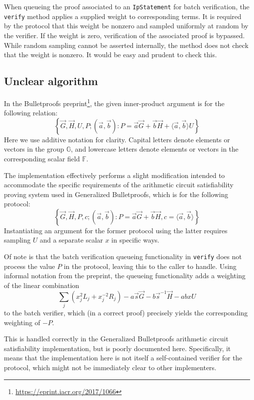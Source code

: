 \documentclass{article}
\begin{document}
When queueing the proof associated to an \texttt{IpStatement} for batch verification, the \texttt{verify} method applies a supplied weight to corresponding terms.
It is required by the protocol that this weight be nonzero and sampled uniformly at random by the verifier.
If the weight is zero, verification of the associated proof is bypassed.
While random sampling cannot be asserted internally, the method does not check that the weight is nonzero.
It would be easy and prudent to check this.


\subsection{Unclear algorithm}

In the Bulletproofs preprint\footnote{\url{https://eprint.iacr.org/2017/1066}}, the given inner-product argument is for the following relation:
$$\left\{ \vec{G}, \vec{H}, U, P ; (\vec{a}, \vec{b}) : P = \vec{a} \vec{G} + \vec{b} \vec{H} + \langle \vec{a}, \vec{b} \rangle U \right\}$$
Here we use additive notation for clarity.
Capital letters denote elements or vectors in the group $\mathbb{G}$, and lowercase letters denote elements or vectors in the corresponding scalar field $\mathbb{F}$.

The implementation effectively performs a slight modification intended to accommodate the specific requirements of the arithmetic circuit satisfiability proving system used in Generalized Bulletproofs, which is for the following protocol:
$$\left\{ \vec{G}, \vec{H}, P, c ; (\vec{a}, \vec{b}) : P = \vec{a} \vec{G} + \vec{b} \vec{H}, c = \langle \vec{a}, \vec{b} \rangle \right\}$$
Instantiating an argument for the former protocol using the latter requires sampling $U$ and a separate scalar $x$ in specific ways.

Of note is that the batch verification queueing functionality in \texttt{verify} does not process the value $P$ in the protocol, leaving this to the caller to handle.
Using informal notation from the preprint, the queueing functionality adds a weighting of the linear combination
$$\sum_j \left( x_j^2 L_j + x_j^{-2} R_j \right) - a \vec{s} \vec{G} - b \vec{s}^{-1} \vec{H} - a b x U$$
to the batch verifier, which (in a correct proof) precisely yields the corresponding weighting of $-P$.

This is handled correctly in the Generalized Bulletproofs arithmetic circuit satisfiability implementation, but is poorly documented here.
Specifically, it means that the implementation here is not itself a self-contained verifier for the protocol, which might not be immediately clear to other implementers.
\end{document}

